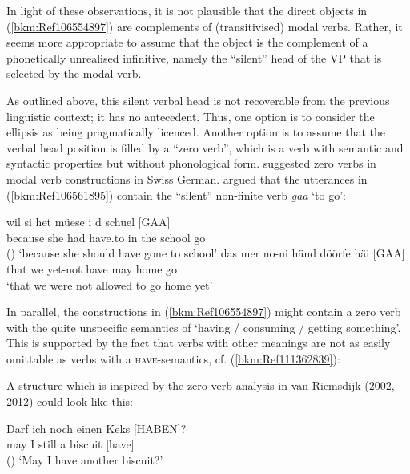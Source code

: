 \documentclass[output=paper
  ,nobabel
  ,draftmode
  ,colorlinks, citecolor=brown
]{langscibook}
\begin{document}
\noindent
In light of these observations, it is not plausible that the direct objects in
(\ref{bkm:Ref106554897}) are complements of (transitivised) modal verbs. Rather, it seems more
appropriate to assume that the object is the complement of a phonetically unrealised infinitive,
namely the ``silent'' head of the VP that is selected by the modal verb.

As outlined above, this silent verbal head is not recoverable from the previous linguistic context;
it has no antecedent. Thus, one option is to consider the ellipsis as being pragmatically
licenced. Another option is to assume that the verbal head position is filled by a ``zero verb'',
which is a verb with semantic and syntactic properties but without phonological
form.  suggested zero verbs in modal verb constructions in
Swiss German.  argued that the utterances in (\ref{bkm:Ref106561895})
contain the ``silent'' non-finite verb \emph{gaa} `to go':



\eal
\label{bkm:Ref106561895}
\ex
\gll wil           si    het    müese    i    d     schuel   [GAA]\\
       because   she  had  have.to  in   the  school  go\\\hfill()
\glt   `because she should have gone to school'
\ex
\gll das   mer  no-ni        händ  döörfe  häi       [GAA]\\
       that  we    yet-not    have  may      home   go \\
\glt   `that we were not allowed to go home yet'
\zl

\noindent
In parallel, the constructions in (\ref{bkm:Ref106554897}) might contain a zero verb with the quite
unspecific semantics of `having / consuming / getting something'. This is supported by the fact that
verbs with other meanings are not as easily omittable as verbs with a \textsc{have}{}-semantics,
cf. (\ref{bkm:Ref111362839}):

\z
\noindent
A structure which is inspired by the zero-verb analysis in van Riemsdijk (2002, 2012) could look
like this:

\eal
\label{bkm:Ref106563285}
\ex
\gll Darf  ich  noch  einen   Keks     [\MakeUppercase{haben}]?\\
       may  I      still    a          biscuit  [have]\\\hfill()
\glt   `May I have another biscuit?'
\end{document}
